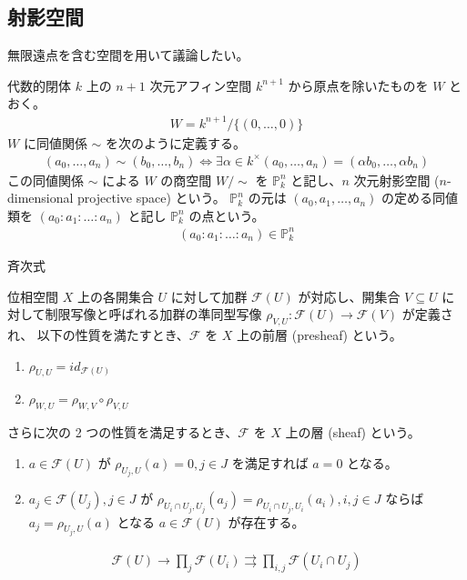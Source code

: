 \documentclass[uplatex,dvipdfmx,a4paper,11pt]{jlreq}
\newcommand{\PP}{\mathbb{P}}
\newcommand{\FF}{\mathcal{F}}
\numberwithin{equation}{section}
\theoremstyle{definition}
\begin{document}
\subsection{射影空間}
無限遠点を含む空間を用いて議論したい。
\begin{definition}[射影空間]
  代数的閉体 $k$ 上の $n + 1$ 次元アフィン空間 $k^{n+1}$ から原点を除いたものを $W$ とおく。
  \begin{align}
    W = k^{n+1}/\lbrace(0,\ldots,0)\rbrace
  \end{align}
  $W$ に同値関係 $\sim$ を次のように定義する。
  \begin{align}
    (a_0,\ldots,a_n)\sim(b_0,\ldots,b_n) \iff \exists\alpha\in k^\times (a_0,\ldots,a_n) = (\alpha b_0,\ldots,\alpha b_n)
  \end{align}
  この同値関係 $\sim$ による $W$ の商空間 $W/\sim$ を $\PP_k^n$ と記し、$n$ 次元射影空間 ($n$-dimensional projective space) という。
  $\PP_k^n$ の元は $(a_0, a_1, \ldots, a_n)$ の定める同値類を $(a_0 : a_1 : \ldots : a_n)$ と記し $\PP_k^n$ の点という。
  \begin{align}
    (a_0 : a_1 : \ldots : a_n)\in\PP_k^n
  \end{align}
\end{definition}
斉次式

\begin{definition}[層]
  位相空間 $X$ 上の各開集合 $U$ に対して加群 $\mathcal{F}(U)$ が対応し、開集合 $V\subseteq U$ に対して制限写像と呼ばれる加群の準同型写像 $\rho_{V,U}: \FF(U)\to\FF(V)$ が定義され、
  以下の性質を満たすとき、$\mathcal{F}$ を $X$ 上の前層 (presheaf) という。
  \begin{enumerate}
    \item $\rho_{U, U} = id_{\FF(U)}$
    \item $\rho_{W, U} = \rho_{W,V}\circ\rho_{V,U}$
  \end{enumerate}
  さらに次の 2 つの性質を満足するとき、$\mathcal{F}$ を $X$ 上の層 (sheaf) という。
  \begin{enumerate}
    \item $a\in\FF(U)$ が $\rho_{U_j, U}(a) = 0, j\in J$ を満足すれば $a = 0$ となる。
    \item $a_j\in\FF(U_j), j\in J$ が $\rho_{U_i\cap U_j, U_j}(a_j) = \rho_{U_i\cap U_j, U_i}(a_i), i,j\in J$ ならば $a_j = \rho_{U_j,U}(a)$ となる $a\in\FF(U)$ が存在する。
  \end{enumerate}
  \begin{align}
    \FF(U) \to \prod_j\FF(U_i) \rightrightarrows \prod_{i,j}\FF(U_i\cap U_j)
  \end{align}
\end{definition}
\end{document}
